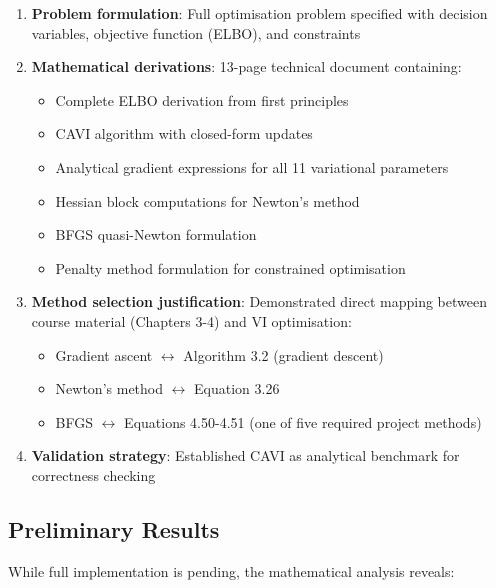 \documentclass[11pt]{article}
\begin{document}
\begin{enumerate}
\item \textbf{Problem formulation}: Full optimisation problem specified with decision variables, objective function (ELBO), and constraints

\item \textbf{Mathematical derivations}: 13-page technical document containing:
\begin{itemize}
\item Complete ELBO derivation from first principles
\item CAVI algorithm with closed-form updates
\item Analytical gradient expressions for all 11 variational parameters
\item Hessian block computations for Newton's method
\item BFGS quasi-Newton formulation
\item Penalty method formulation for constrained optimisation
\end{itemize}

\item \textbf{Method selection justification}: Demonstrated direct mapping between course material (Chapters 3-4) and VI optimisation:
\begin{itemize}
\item Gradient ascent $\leftrightarrow$ Algorithm 3.2 (gradient descent)
\item Newton's method $\leftrightarrow$ Equation 3.26
\item BFGS $\leftrightarrow$ Equations 4.50-4.51 (one of five required project methods)
\end{itemize}

\item \textbf{Validation strategy}: Established CAVI as analytical benchmark for correctness checking
\end{enumerate}

\subsection{Preliminary Results}

While full implementation is pending, the mathematical analysis reveals:
\end{document}

